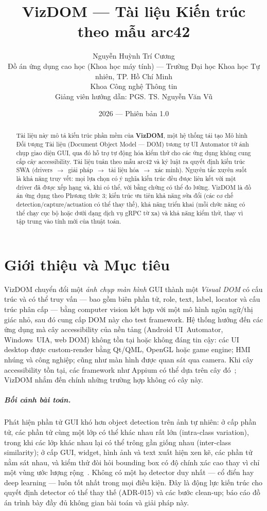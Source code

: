 \documentclass[11pt,a4paper]{report}
\title{\textbf{VizDOM --- Tài liệu Kiến trúc}\\[0.3em]
\large theo mẫu arc42}
\author{Nguyễn Huỳnh Trí Cương\\
\small Đồ án ứng dụng cao học (Khoa học máy tính) --- Trường Đại học Khoa học Tự nhiên, TP. Hồ Chí Minh\\
\small Khoa Công nghệ Thông tin\\
\small Giảng viên hướng dẫn: PGS. TS. Nguyễn Văn Vũ}
\date{2026 --- Phiên bản 1.0}
\begin{document}
\maketitle

\begin{abstract}
\noindent Tài liệu này mô tả kiến trúc phần mềm của \textbf{VizDOM}, một hệ thống tái tạo
Mô hình Đối tượng Tài liệu (Document Object Model --- DOM) tương tự UI Automator từ
ảnh chụp giao diện GUI, qua đó hỗ trợ tự động hóa kiểm thử cho các ứng dụng không cung
cấp cây accessibility. Tài liệu tuân theo mẫu arc42 và kỷ luật ra quyết định kiến trúc
SWA (drivers~$\rightarrow$~giải pháp~$\rightarrow$~tài liệu hóa~$\rightarrow$~xác minh).
Nguyên tắc xuyên suốt là khả năng truy vết: mọi lựa chọn có ý nghĩa kiến trúc đều được
liên kết với một driver đã được xếp hạng và, khi có thể, với bằng chứng có thể đo lường.
VizDOM là đồ án ứng dụng theo Phương thức 3; kiến trúc ưu tiên khả năng sửa đổi
(các cơ chế detection/capture/actuation có thể thay thế), khả năng triển khai
(mỗi chức năng có thể chạy cục bộ hoặc dưới dạng dịch vụ gRPC từ xa) và khả năng kiểm thử,
thay vì tập trung vào tính mới của thuật toán.
\end{abstract}

\tableofcontents

\chapter{Giới thiệu và Mục tiêu}
VizDOM chuyển đổi một \emph{ảnh chụp màn hình} GUI thành một \emph{Visual DOM} có cấu
trúc và có thể truy vấn --- bao gồm biên phần tử, role, text, label, locator và cấu trúc
phân cấp --- bằng computer vision kết hợp với một mô hình ngôn ngữ/thị giác nhỏ, sau đó
cung cấp DOM này cho test framework. Hệ thống hướng đến các ứng dụng mà cây accessibility
của nền tảng (Android UI~Automator, Windows~UIA, web DOM) không tồn tại hoặc không đáng
tin cậy: các UI desktop được custom-render bằng Qt/QML, OpenGL hoặc game engine; HMI
nhúng và công nghiệp; cũng như màn hình được quan sát qua camera. Khi cây accessibility
tồn tại, các framework như Appium có thể dựa trên cây đó~\cite{uiautomator,appium}; VizDOM
nhắm đến chính những trường hợp không có cây này.

\paragraph{Bối cảnh bài toán.} Phát hiện phần tử GUI khó hơn object detection trên ảnh tự
nhiên: ở cấp phần tử, các phần tử cùng một lớp có thể khác nhau rất lớn (intra-class
variation), trong khi các lớp khác nhau lại có thể trông gần giống nhau (inter-class
similarity); ở cấp GUI, widget, hình ảnh và text xuất hiện xen kẽ, các phần tử nằm sát nhau,
và kiểm thử đòi hỏi bounding box có độ chính xác cao thay vì chỉ một vùng ước lượng
rộng~\cite{xie2020uied}. Không có một họ detector duy nhất --- cổ điển hay deep learning ---
luôn tốt nhất trong mọi điều kiện. Đây là động lực kiến trúc cho quyết định detector có thể
thay thế (ADR-015) và các bước clean-up; báo cáo đồ án trình bày đầy đủ không gian bài toán
và giải pháp này.
\end{document}
